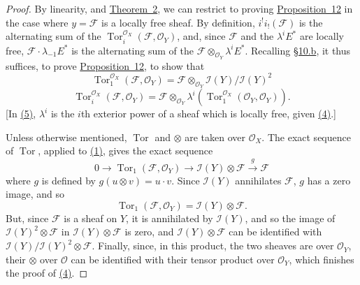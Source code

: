 \documentclass{article}
\newcommand{\scr}[1]{{\mathscr{#1}}}
\DeclareMathOperator{\Tor}{Tor}
\newcommand{\oldpage}[1]{\marginpar{\footnotesize$\Big\vert$ \textit{p.~#1}}}
\begin{document}
\begin{proof}
  By linearity, and \hyperref[theorem2]{Theorem~2}, we can restrict to proving \hyperref[proposition12]{Proposition~12} in the case where $y=\scr{F}$ is a locally free sheaf.
  By definition, $i^!i_!(\scr{F})$ is the alternating sum of the $\Tor_i^{\scr{O}_X}(\scr{F},\scr{O}_Y)$, and, since $\scr{F}$ and the $\lambda^i E^*$ are locally free, $\scr{F}\cdot\lambda_{-1}E^*$ is the alternating sum of the $\scr{F}\otimes_{\scr{O}_Y}\lambda^i E^*$.
  Recalling \hyperref[subsection10b]{\S10.b}, it thus suffices, to prove \hyperref[proposition12]{Proposition~12}, to show that
  \[
  \label{equation4}
    \Tor_1^{\scr{O}_X}(\scr{F},\scr{O}_Y)
    = \scr{F} \otimes_{\scr{O}_Y} \scr{I}(Y)/\scr{I}(Y)^2
    \tag{4}
  \]
  \[
  \label{equation5}
    \Tor_i^{\scr{O}_X}(\scr{F},\scr{O}_Y)
    = \scr{F} \otimes_{\scr{O}_Y} \lambda^i(\Tor_1^{\scr{O}_X}(\scr{O}_Y,\scr{O}_Y)).
    \tag{5}
  \]
  [In \hyperref[equation5]{(5)}, $\lambda^i$ is the $i$th exterior power of a sheaf which is locally free, given \hyperref[equation4]{(4)}.]

  Unless otherwise mentioned, $\Tor$ and $\otimes$ are taken over $\scr{O}_X$.
  The exact sequence of $\Tor$, applied to \hyperref[section10aequation1]{(1)}, gives the exact sequence
  \[
    0 \to \Tor_1(\scr{F},\scr{O}_Y) \to \scr{I}(Y)\otimes\scr{F} \xrightarrow{g} \scr{F}
  \]
  where $g$ is defined by $g(u\otimes v)=u\cdot v$.
  Since $\scr{I}(Y)$ annihilates $\scr{F}$, $g$ has a zero image, and so
  \[
    \Tor_1(\scr{F},\scr{O}_Y) = \scr{I}(Y)\otimes\scr{F}.
  \]
  But, since $\scr{F}$ is a sheaf on $Y$, it is annihilated by $\scr{I}(Y)$, and so the image of $\scr{I}(Y)^2\otimes\scr{F}$ in $\scr{I}(Y)\otimes\scr{F}$ is zero, and $\scr{I}(Y)\otimes\scr{F}$ can be identified with $\scr{I}(Y)/\scr{I}(Y)^2\otimes\scr{F}$.
  Finally, since, in this product, the two sheaves are
\oldpage{123}
  over $\scr{O}_Y$, their $\otimes$ over $\scr{O}$ can be identified with their tensor product over $\scr{O}_Y$, which finishes the proof of \hyperref[equation4]{(4)}.


\end{proof}
\end{document}

